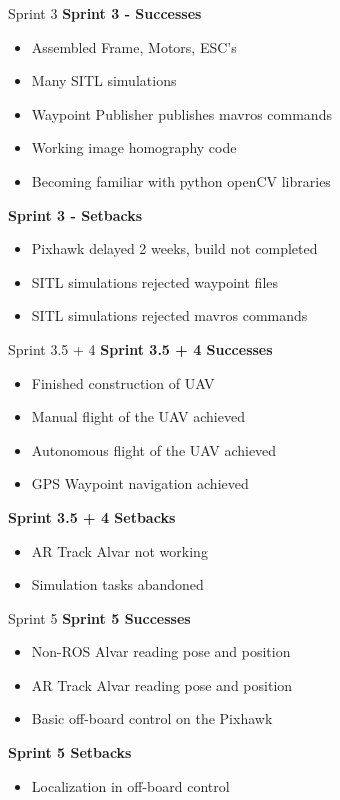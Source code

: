 \documentclass[11pt]{beamer}
\begin{document}
 
 \begin{frame}{Sprint 3}
	\large{\textbf{Sprint 3 - Successes}}
	\begin{itemize}
		\item Assembled Frame, Motors, ESC's
		\item Many SITL simulations
		\item Waypoint Publisher publishes mavros commands
		\item Working image homography code
		\item Becoming familiar with python openCV libraries
	\end{itemize}
	\large{\textbf{Sprint 3 - Setbacks}}
	\begin{itemize}
		\item Pixhawk delayed 2 weeks, build not completed
		\item SITL simulations rejected waypoint files
		\item SITL simulations rejected mavros commands
	\end{itemize}
 \end{frame}
 
 
  \begin{frame}{Sprint 3.5 + 4}
  	\large{\textbf{Sprint 3.5 + 4 Successes}}
  	\begin{itemize}
  		\item Finished construction of UAV
  		\item Manual flight of the UAV achieved
  		\item Autonomous flight of the UAV achieved
  		\item GPS Waypoint navigation achieved
  	\end{itemize}
  	\large{\textbf{Sprint 3.5 + 4 Setbacks}}
  	\begin{itemize}
  		\item AR Track Alvar not working
  		\item Simulation tasks abandoned
  	\end{itemize}
  \end{frame}
  
   \begin{frame}{Sprint 5}
   	\large{\textbf{Sprint 5 Successes}}
   	\begin{itemize}
   		\item Non-ROS Alvar reading pose and position
   		\item AR Track Alvar reading pose and position
   		\item Basic off-board control on the Pixhawk
   	\end{itemize}
   	\large{\textbf{Sprint 5 Setbacks}}
   	\begin{itemize}
   		\item Localization in off-board control
   	\end{itemize}
   \end{frame}
\end{document}
